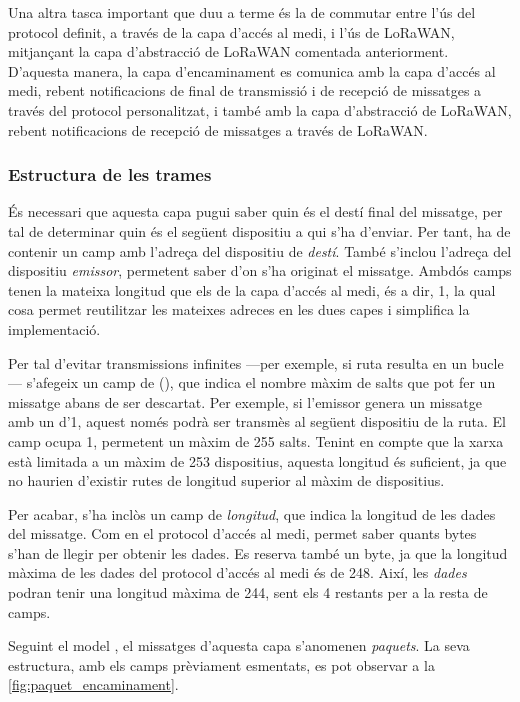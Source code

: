\documentclass{tfgitic}[2024/07/01]
\begin{document}
{Una altra tasca important que duu a terme és la de commutar entre l’ús del protocol definit, a través de la capa d’accés al medi, i l’ús de LoRaWAN, mitjançant la capa d’abstracció de LoRaWAN comentada anteriorment. D’aquesta manera, la capa d’encaminament es comunica amb la capa d’accés al medi, rebent notificacions de final de transmissió i de recepció de missatges a través del protocol personalitzat, i també amb la capa d’abstracció de LoRaWAN, rebent notificacions de recepció de missatges a través de LoRaWAN.

\subsubsection{Estructura de les trames}
És necessari que aquesta capa pugui saber quin és el destí final del missatge, per tal de determinar quin és el següent dispositiu a qui s'ha d'enviar. Per tant, ha de contenir un camp amb l'adreça del dispositiu de \emph{destí}. També s'inclou l'adreça del dispositiu \emph{emissor}, permetent saber d'on s'ha originat el missatge. Ambdós camps tenen la mateixa longitud que els de la capa d’accés al medi, és a dir, \SI{1}{\byte}, la qual cosa permet reutilitzar les mateixes adreces en les dues capes i simplifica la implementació.

Per tal d'evitar transmissions infinites ---per exemple, si ruta resulta en un bucle--- s'afegeix un camp de  (), que indica el nombre màxim de salts que pot fer un missatge abans de ser descartat. Per exemple, si l'emissor genera un missatge amb un  d'1, aquest només podrà ser transmès al següent dispositiu de la ruta. El camp  ocupa \SI{1}{\byte}, permetent un màxim de 255 salts. Tenint en compte que la xarxa està limitada a un màxim de 253 dispositius, aquesta longitud és suficient, ja que no haurien d'existir rutes de longitud superior al màxim de dispositius.

Per acabar, s'ha inclòs un camp de \emph{longitud}, que indica la longitud de les dades del missatge. Com en el protocol d'accés al medi, permet saber quants bytes s'han de llegir per obtenir les dades. Es reserva també un byte, ja que la longitud màxima de les dades del protocol d'accés al medi és de \SI{248}{\byte}. Així, les \emph{dades} podran tenir una longitud màxima de \SI{244}{\byte}, sent els \SI{4}{\byte} restants per a la resta de camps.

Seguint el model , el missatges d'aquesta capa s'anomenen \emph{paquets}. La seva estructura, amb els camps prèviament esmentats, es pot observar a la \autoref{fig:paquet_encaminament}.

}
\end{document}
